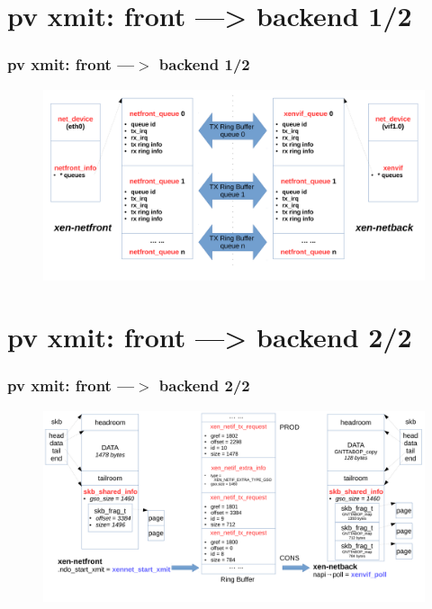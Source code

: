 \documentclass[aspectratio=169]{beamer}
\begin{document}

\section{pv xmit: front ---> backend 1/2}
\begin{frame}
\frametitle{pv xmit: front ---$>$ backend 1/2}
\begin{figure}
\includegraphics[width=1.0\linewidth]{figures/eth_to_vif.pdf}
\end{figure}
\end{frame}


\section{pv xmit: front ---> backend 2/2}
\begin{frame}
\frametitle{pv xmit: front ---$>$ backend 2/2}
\begin{figure}
\includegraphics[width=1.0\linewidth]{figures/xmit_skb.pdf}
\end{figure}
\end{frame}
\end{document}
